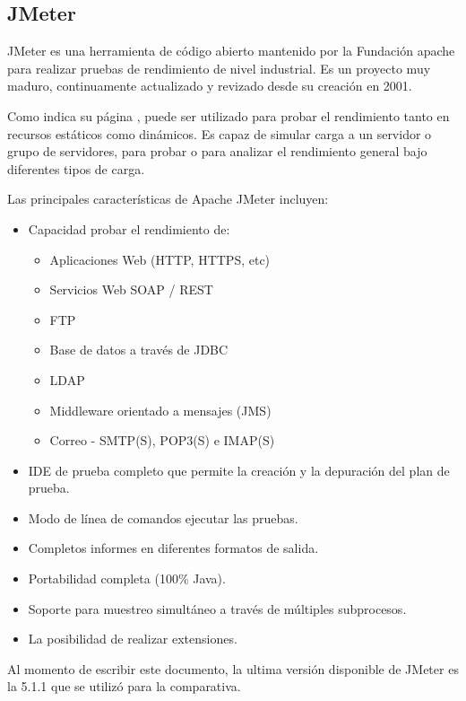 \documentclass[11pt, twocolumns]{article}
\begin{document}
\begin{multicols}{2}
\section{JMeter}
JMeter es una herramienta de código abierto mantenido por la Fundación apache para realizar pruebas de rendimiento de nivel industrial. Es un proyecto muy maduro, continuamente actualizado y revizado desde su creación en 2001.
\par
Como indica su página \cite{jmeter}, puede ser utilizado para probar el rendimiento tanto en recursos estáticos como dinámicos. Es capaz de simular carga a un servidor o grupo de servidores, para probar o para analizar el rendimiento general bajo diferentes tipos de carga.
\par
Las principales características de Apache JMeter incluyen:
\begin{itemize}
  \item Capacidad probar el rendimiento de:
  \begin{itemize}
    \item Aplicaciones Web (HTTP, HTTPS, etc)
    \item Servicios Web SOAP / REST
    \item FTP
    \item Base de datos a través de JDBC
    \item LDAP
    \item Middleware orientado a mensajes (JMS)
    \item Correo - SMTP(S), POP3(S) e IMAP(S)
  \end{itemize}
  \item IDE de prueba completo que permite la creación y la depuración del plan de prueba.
  \item Modo de línea de comandos ejecutar las pruebas.
  \item Completos informes en diferentes formatos de salida.
  \item Portabilidad completa (100\% Java).
  \item Soporte para muestreo simultáneo a través de múltiples subprocesos.
  \item La posibilidad de realizar extensiones.
\end{itemize}
Al momento de escribir este documento, la ultima versión disponible de JMeter es la 5.1.1 que se utilizó para la comparativa.



\end{multicols}
\end{document}
